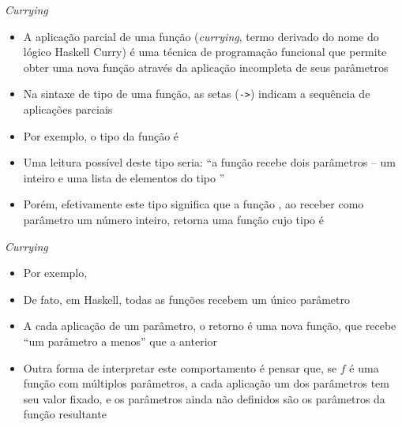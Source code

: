 \begin{frame}[fragile]{\it Currying}

    \begin{itemize}
        \item A aplicação parcial de uma função (\textit{currying}, termo derivado do nome
            do lógico Haskell Curry) é uma técnica de programação
            funcional que permite obter uma nova função através da aplicação incompleta de
            seus parâmetros

        \item Na sintaxe de tipo de uma função, as setas (\texttt{->}) indicam a sequência de
            aplicações parciais

        \item Por exemplo, o tipo da função  é


        \item Uma leitura possível deste tipo seria: ``a função  recebe dois
            parâmetros -- um inteiro e uma lista de elementos do tipo ''

        \item Porém, efetivamente este tipo significa que a função , ao receber
            como parâmetro um número inteiro, retorna uma função  cujo tipo
            é 

    \end{itemize}

\end{frame}

\begin{frame}[fragile]{\it Currying}

    \begin{itemize}
        \item Por exemplo, 


        \item De fato, em Haskell, todas as funções recebem um único parâmetro

        \item A cada aplicação de um parâmetro, o retorno é uma nova função, que recebe 
            ``um parâmetro a menos'' que a anterior

        \item Outra forma de interpretar este comportamento é pensar que, se $f$ é uma 
            função com múltiplos parâmetros, a cada aplicação um dos parâmetros tem seu
            valor fixado, e os parâmetros ainda não definidos são os parâmetros da função
            resultante
    \end{itemize}

\end{frame}

